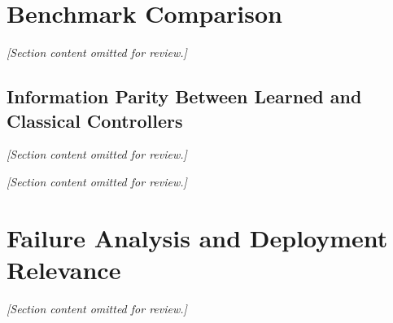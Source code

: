 \section{Benchmark Comparison}

\begin{table}[H]
\centering
\caption{Forward lane-following: controller benchmark (no obstacles, 50~eval episodes, held-out seeds).}
\label{tab:benchmark_forward}
\end{table}
\begin{table}[H]
\centering
\caption{Reverse lane-following: controller benchmark (no obstacles, 50~eval episodes, held-out seeds).}
\label{tab:benchmark_reverse}
\end{table}

\textit{[Section content omitted for review.]}

\subsection{Information Parity Between Learned and Classical Controllers}
\label{sec:information_parity}
\textit{[Section content omitted for review.]}

\begin{table}[H]
\centering
\caption{Reference-path information available to each method at a single control step on the no-obstacle tasks. The learned policy's observation is a strict superset of the information used by the pure-pursuit and PID baselines; only MPC receives an explicit preview of the path ahead.}
\label{tab:information_parity}
\end{table}

\textit{[Section content omitted for review.]}

\section{Failure Analysis and Deployment Relevance}
\textit{[Section content omitted for review.]}

\begin{table}[H]
\centering
\caption{Recommended experiment matrix for the thesis}
\label{tab:experiment_matrix}
\end{table}
